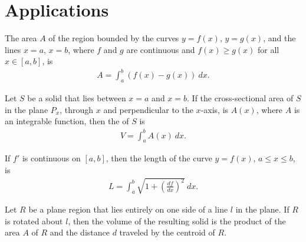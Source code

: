 \documentclass{article}
\begin{document}
\section{Applications}
\begin{definition}
    The area $A$ of the region bounded by the curves $y=f(x)$, $y=g(x)$, and the lines $x=a$, $x=b$, where $f$ and $g$ are continuous and $f(x)\geq g(x)$ for all $x\in[a,b]$, is
    \begin{align*}
        A=\int_a^b \left(f(x)-g(x)\right)\:dx.
    \end{align*}
\end{definition}
\begin{definition}
    Let $S$ be a solid that lies between $x=a$ and $x=b$. If the cross-sectional area of $S$ in the plane $P_x$, through $x$ and perpendicular to the $x$-axis, is $A(x)$, where $A$ is an integrable function, then the  of $S$ is
    \begin{align*}
        V=\int_a^b A(x)\:dx.
    \end{align*}
\end{definition}
\begin{theorem}
     If $f'$ is continuous on $[a,b]$, then the length of the curve $y=f(x)$, $a\leq x \leq b$, is
    \begin{align*}
        L = \int_a^b \sqrt{1+\left(\frac{df}{dx}\right)^2}\:dx.
    \end{align*}
\end{theorem}
\begin{theorem}
     Let $R$ be a plane region that lies entirely on one side of a line $l$ in the plane. 
    If $R$ is rotated about $l$, then the volume of the resulting solid is the product of the area $A$ of $R$ and the distance $d$ traveled by the centroid of $R$.
\end{theorem}
\end{document}
